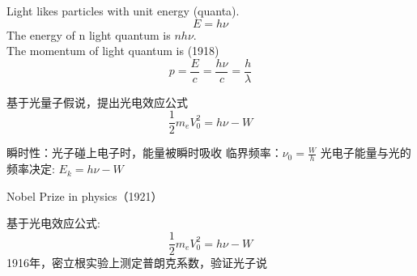 \begin{frame}
    \frametitle{}
        \begin{figure}
            \centering
        \end{figure}
    \setcounter{subfigure}{0}
\end{frame}

\begin{frame} 
    \begin{tcolorbox4}
        {\Bullet} Light likes particles with unit energy  (quanta).\\
        \[E=h\nu\]  
        {\Bullet} The energy of n light quantum is $nh\nu$. \\
        {\Bullet} The momentum of light quantum is (1918) \\
        \[p=\frac{E}{c}=\frac{h\nu}{c}=\frac{h}{\lambda}\]
    \end{tcolorbox4}
\end{frame}

\begin{frame} 
    基于光量子假说，提出光电效应公式
    \[
    \frac{1}{2}m_eV_0^2=h\nu-W
    \]
    \begin{itemize}
        \Item  瞬时性：光子碰上电子时，能量被瞬时吸收
        \Item  临界频率：$\nu_0=\frac{W}{h} $
        \Item  光电子能量与光的频率决定: $E_k=h\nu-W$
    \end{itemize}
    {\color{deepred} Nobel Prize in physics（1921）}
\end{frame}

\begin{frame} 
    基于光电效应公式:
$$
\frac{1}{2}m_eV_0^2=h\nu-W
$$
1916年，密立根实验上测定普朗克系数，验证光子说\\
\color{deepred}{1923年诺贝尔物理学奖} 
\end{frame}

